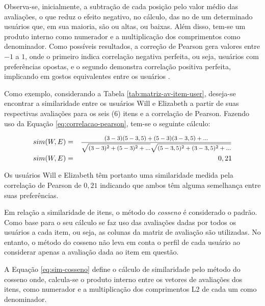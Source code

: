          Observa-se, inicialmente, a subtração de cada posição pelo valor médio das avaliações, o que reduz o efeito negativo, no cálculo, das no de um determinado usuários que, em sua maioria, são ou altas, ou baixas. Além disso, tem-se um produto interno como numerador e a multiplicação dos comprimentos como denominador. Como possíveis resultados, a correção de Pearson gera valores entre $-1$ a $1$, onde o primeiro indica correlação negativa perfeita, ou seja, usuários com preferências opostas, e o segundo demonstra correlação positiva perfeita, implicando em gostos equivalentes entre os usuários \cite{Jannach2010}.
        
        
        Como exemplo, considerando a Tabela \ref{tab:matriz-av-item-user}, deseja-se encontrar a similaridade entre os usuários Will e Elizabeth a partir de suas respectivas avaliações para os seis (6) itens e a correlação de Pearson. Fazendo uso da Equação \ref{eq:correlacao-pearson}, tem-se o seguinte cálculo:
        
        \begin{eqnarray}
            sim(W, E) &=& \text{\footnotesize   $\frac{(3-3)(5-3,5)+(5-3)(3-3,5)+...}{\sqrt{(3-3)^2+(5-3)^2+...}\sqrt{(5-3,5)^2+(3-3,5)^2+...}} $} \nonumber \\
            sim(W, E) &=& 0,21 \nonumber
        \end{eqnarray}
    
        Os usuários Will e Elizabeth têm portanto uma similaridade medida pela correlação de Pearson de $0,21$ indicando que ambos têm alguma semelhança entre suas preferências.
    
        Em relação a similaridade de itens, o método do \textit{cosseno} é considerado o padrão. Como base para o seu cálculo se faz uso das avaliações dadas por todos os usuários a cada item, ou seja, as colunas da matriz de avaliação são utilizadas. No entanto, o método do cosseno não leva em conta o perfil de cada usuário ao considerar apenas a avaliação dada ao item em questão\cite{Jannach2010}.
        
        A Equação \ref{eq:sim-cosseno} define o cálculo de similaridade pelo método do cosseno onde, calcula-se o produto interno entre os vetores de avaliações dos itens, como numerador e a multiplicação dos comprimentos L2 de cada um como denominador.         
        
